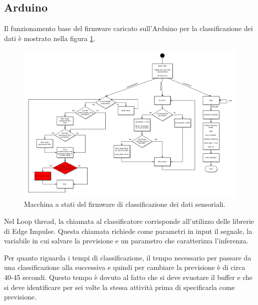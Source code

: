 \subsection{Arduino} \label{arduinoSect}
Il funzionamento base del firmware caricato sull'Arduino per la classificazione dei dati è mostrato nella figura \ref{fig:SM_classif}.
\begin{figure}[tbh]
	\centering
	\includegraphics[width=0.8\linewidth]{./ImageFiles/SM_classification}
	\caption{Macchina a stati del firmware di classificazione dei dati sensoriali.}
	\label{fig:SM_classif}
\end{figure}
Nel Loop thread, la chiamata al classificatore corrisponde all'utilizzo delle librerie di Edge Impulse. Questa chiamata richiede come parametri in input il segnale, la variabile in cui salvare la previsione e un parametro che caratterizza l'inferenza.

Per quanto riguarda i tempi di classificazione, il tempo necessario per passare da una classificazione alla successiva e quindi per cambiare la previsione è di circa 40-45 secondi. Questo tempo è dovuto al fatto che si deve svuotare il buffer e che si deve identificare per sei volte la stessa attività prima di specificarla come previsione.